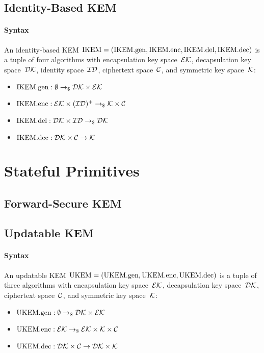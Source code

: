 \documentclass[a4paper,orivec]{llncs}
\begin{document}
\subsection{Identity-Based KEM}

\paragraph{Syntax}
An identity-based KEM $\mathrm{IKEM}=(\mathrm{IKEM}.\mathrm{gen},\mathrm{IKEM}.\mathrm{enc},\mathrm{IKEM}.\mathrm{del},\mathrm{IKEM}.\mathrm{dec})$ is a tuple of four algorithms with encapsulation key space~$\mathcal{EK}$, decapsulation key space~$\mathcal{DK}$, identity space~$\mathcal{ID}$, ciphertext space~$\mathcal{C}$, and symmetric key space~$\mathcal{K}$:

\begin{itemize}
    \item $\mathrm{IKEM}.\mathrm{gen}: \emptyset \to_\$ \mathcal{DK}\times\mathcal{EK}$
    \item $\mathrm{IKEM}.\mathrm{enc}: \mathcal{EK}\times(\mathcal{ID})^+ \to_\$ \mathcal{K}\times\mathcal{C}$
    \item $\mathrm{IKEM}.\mathrm{del}: \mathcal{DK}\times\mathcal{ID} \to_\$ \mathcal{DK}$
    \item $\mathrm{IKEM}.\mathrm{dec}: \mathcal{DK}\times\mathcal{C} \to \mathcal{K}$
\end{itemize}


\section{Stateful Primitives}

\subsection{Forward-Secure KEM}



\subsection{Updatable KEM}

\paragraph{Syntax}
An updatable KEM $\mathrm{UKEM}=(\mathrm{UKEM}.\mathrm{gen},\mathrm{UKEM}.\mathrm{enc},\mathrm{UKEM}.\mathrm{dec})$ is a tuple of three algorithms with encapsulation key space~$\mathcal{EK}$, decapsulation key space~$\mathcal{DK}$, ciphertext space~$\mathcal{C}$, and symmetric key space~$\mathcal{K}$:

\begin{itemize}
    \item $\mathrm{UKEM}.\mathrm{gen}: \emptyset \to_\$ \mathcal{DK}\times\mathcal{EK}$
    \item $\mathrm{UKEM}.\mathrm{enc}: \mathcal{EK} \to_\$ \mathcal{EK}\times\mathcal{K}\times\mathcal{C}$
    \item $\mathrm{UKEM}.\mathrm{dec}: \mathcal{DK}\times\mathcal{C} \to \mathcal{DK}\times\mathcal{K}$
\end{itemize}
\end{document}
